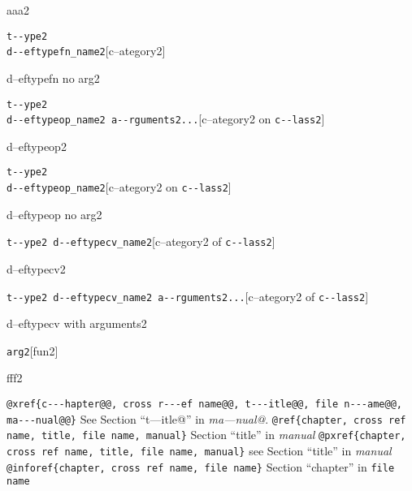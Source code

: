 \documentclass{book}
\begin{document}
%
aaa2

\noindent\texttt{t{-}{-}ype2\leavevmode{}\\d{-}{-}eftypefn\_name2}\hfill[c--ategory2]



%
d--eftypefn no arg2

\noindent\texttt{t{-}{-}ype2\leavevmode{}\\d{-}{-}eftypeop\_name2 a{-}{-}rguments2...}\hfill[c--ategory2 on \texttt{c{-}{-}lass2}]



%
d--eftypeop2

\noindent\texttt{t{-}{-}ype2\leavevmode{}\\d{-}{-}eftypeop\_name2}\hfill[c--ategory2 on \texttt{c{-}{-}lass2}]



%
d--eftypeop no arg2

\noindent\texttt{t{-}{-}ype2 d{-}{-}eftypecv\_name2}\hfill[c--ategory2 of \texttt{c{-}{-}lass2}]



%
d--eftypecv2

\noindent\texttt{t{-}{-}ype2 d{-}{-}eftypecv\_name2 a{-}{-}rguments2...}\hfill[c--ategory2 of \texttt{c{-}{-}lass2}]



%
d--eftypecv with arguments2

\noindent\texttt{arg2}\hfill[fun2]



%
fff2


\texttt{@xref\{c{-}{-}{-}hapter@@, cross r{-}{-}{-}ef name@@, t{-}{-}{-}itle@@, file n{-}{-}{-}ame@@, ma{-}{-}{-}nual@@\}} See Section ``t---itle@'' in \textsl{ma---nual@}.
\texttt{@ref\{chapter, cross ref name, title, file name, manual\}} Section ``title'' in \textsl{manual}
\texttt{@pxref\{chapter, cross ref name, title, file name, manual\}} see Section ``title'' in \textsl{manual}
\texttt{@inforef\{chapter, cross ref name, file name\}} Section ``chapter'' in \texttt{file name}
\end{document}
